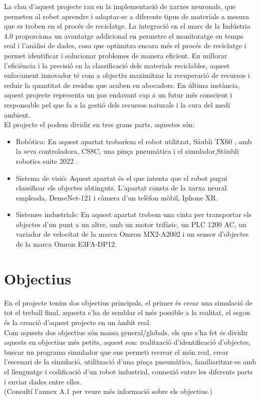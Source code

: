 ﻿\documentclass[10pt,a4paper,twocolumn,twoside]{article}
\begin{document}
La clau d'aquest projecte rau en la implementació de xarxes neuronals, que permeten al robot aprendre i adaptar-se a diferents tipus de materials a mesura que es troben en el procés de reciclatge. La integració en el marc de la Indústria 4.0 proporciona un avantatge addicional en permetre el monitoratge en temps real i l'anàlisi de dades, cosa que optimitza encara més el procés de reciclatge i permet identificar i solucionar problemes de manera eficient. En millorar l'eficiència i la precisió en la classificació dels materials reciclables, aquest enfocament innovador té com a objectiu maximitzar la recuperació de recursos i reduir la quantitat de residus que acaben en abocadors. En última instància, aquest projecte representa un pas endavant cap a un futur més conscient i responsable pel que fa a la gestió dels recursos naturals i la cura del medi ambient.
\\

El projecte el podem dividir en tres grans parts, aquestes són:

\begin{itemize}
  \item Robòtica: En aquest apartat trobaríem el robot utilitzat, Säubli TX60 \cite{TX60}, amb la seva controladora, CS8C\cite{CS8C}, una pinça pneumàtica i el simulador,Stäubli robotics suite 2022\cite{SRS} .
  \item Sistema de visió: Aquest apartat és el que intenta que el robot pugui classificar els objectes obtinguts. L'apartat consta de la xarxa neural empleada, DenseNet-121\cite{DenseNet} i càmera d'un telèfon mòbil, Iphone XR\cite{IphoneXR}.
  \item Sistemes industrials: En aquest apartat trobem una cinta per transportar els objectes d'un punt a un altre, amb un motor trifàsic, un PLC 1200 AC, un variador de velocitat de la marca Omron MX2-A2002 i un sensor d'objectes de la marca Omron E3FA-DP12.
\end{itemize}

\section{Objectius}

En el projecte tenim dos objectius principals, el primer és crear una simulació de tot el treball final, aquesta s'ha de semblar el més possible a la realitat, el segon és la creació d'aquest projecte en un àmbit real.
\\

Com aquests dos objectius són massa general/globals, els que s'ha fet és dividir aquests en objectius més petits, aquest son: realització d'identificació d'objectes, buscar un programa simulador que ens permeti recrear el món real, crear l'escenari de la simulació, utilització d'una pinça pneumàtica, familiaritzar-se amb el llenguatge i codificació d'un robot industrial, connexió entre les diferents parts i enviar dades entre elles.
\\
\hfill \break
(Consultí l’annex A.1 per veure més informació sobre els objectius.)
\end{document}
